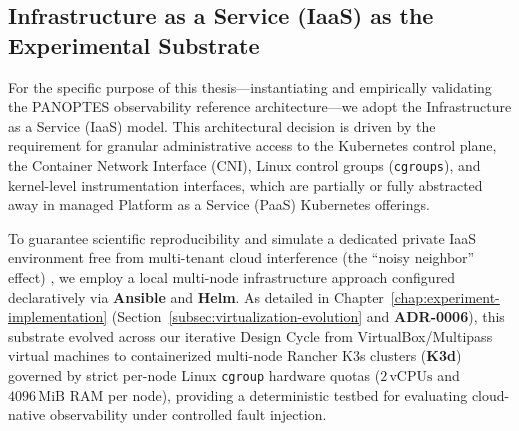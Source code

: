 \subsection{Infrastructure as a Service (IaaS) as the Experimental Substrate}
\label{subsec:iaas-substrate}

For the specific purpose of this thesis---instantiating and empirically validating the PANOPTES observability reference architecture---we adopt the Infrastructure as a Service (IaaS) model. This architectural decision is driven by the requirement for granular administrative access to the Kubernetes control plane, the Container Network Interface (CNI), Linux control groups (\texttt{cgroups}), and kernel-level instrumentation interfaces, which are partially or fully abstracted away in managed Platform as a Service (PaaS) Kubernetes offerings.

To guarantee scientific reproducibility and simulate a dedicated private IaaS environment free from multi-tenant cloud interference (the ``noisy neighbor'' effect) \cite{kuria_2024}, we employ a local multi-node infrastructure approach configured declaratively via \textbf{Ansible} and \textbf{Helm}. As detailed in Chapter~\ref{chap:experiment-implementation} (Section~\ref{subsec:virtualization-evolution} and \textbf{ADR-0006}), this substrate evolved across our iterative Design Cycle from VirtualBox/Multipass virtual machines to containerized multi-node Rancher K3s clusters (\textbf{K3d}) governed by strict per-node Linux \texttt{cgroup} hardware quotas ($2\,\text{vCPUs}$ and $4096\,\text{MiB}$ RAM per node), providing a deterministic testbed for evaluating cloud-native observability under controlled fault injection.
